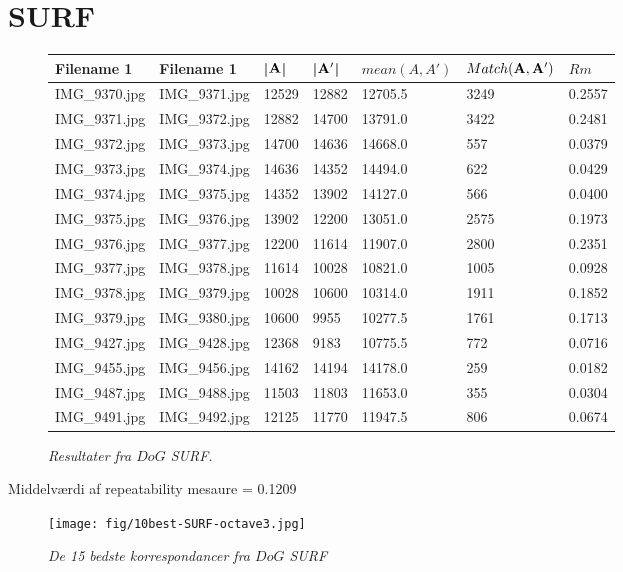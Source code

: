\section{SURF}
\begin{figure}[H]
    \centering
    \begin{center}    
    \begin{tabular}{ | l | l | l | l | l | l | l |}
    \hline
    Filename 1 & Filename 1 & |$\bold{A}$| & |$\bold{A'}$| & $mean(A,A')$ & $Match(\bold{A}, \bold{A}')$ & $Rm$ \\ \hline
IMG\_9370.jpg &	IMG\_9371.jpg &	12529 &	12882 &	12705.5 &	3249 &	0.2557\\ \hline
IMG\_9371.jpg &	IMG\_9372.jpg &	12882 &	14700 &	13791.0 &	3422 &	0.2481\\ \hline
IMG\_9372.jpg &	IMG\_9373.jpg &	14700 &	14636 &	14668.0 &	557 &	0.0379\\ \hline
IMG\_9373.jpg &	IMG\_9374.jpg &	14636 &	14352 &	14494.0 &	622 &	0.0429\\ \hline
IMG\_9374.jpg &	IMG\_9375.jpg &	14352 &	13902 &	14127.0 &	566 &	0.0400\\ \hline
IMG\_9375.jpg &	IMG\_9376.jpg &	13902 &	12200 &	13051.0 &	2575 &	0.1973\\ \hline
IMG\_9376.jpg &	IMG\_9377.jpg &	12200 &	11614 &	11907.0 &	2800 &	0.2351\\ \hline
IMG\_9377.jpg &	IMG\_9378.jpg &	11614 &	10028 &	10821.0 &	1005 &	0.0928\\ \hline
IMG\_9378.jpg &	IMG\_9379.jpg &	10028 &	10600 &	10314.0 &	1911 &	0.1852\\ \hline
IMG\_9379.jpg &	IMG\_9380.jpg &	10600 &	9955 &	10277.5 &	1761 &	0.1713\\ \hline
IMG\_9427.jpg &	IMG\_9428.jpg &	12368 &	9183 &	10775.5 &	772 &	0.0716\\ \hline
IMG\_9455.jpg &	IMG\_9456.jpg &	14162 &	14194 &	14178.0 &	259 &	0.0182\\ \hline
IMG\_9487.jpg &	IMG\_9488.jpg &	11503 &	11803 &	11653.0 &	355 &	0.0304\\ \hline
IMG\_9491.jpg &	IMG\_9492.jpg &	12125 &	11770 &	11947.5 &	806 &	0.0674\\ \hline
    \end{tabular}       
    \caption{{\footnotesize \textit{Resultater fra $DoG$ SURF.}}}
    \label{tab:SURFOCTAVE3}
     \end{center}
     \vspace{-2.5em}
\end{figure} \noindent
Middelværdi af repeatability mesaure = 0.1209
\begin{figure}[H]
    \centering
    \texttt{[image: fig/10best-SURF-octave3.jpg]}
    \vspace{-0.5em}   
    \begin{center}
    \caption{{\footnotesize \textit{
    De 15 bedste korrespondancer fra $DoG$ SURF}}}
    \label{fig:lindblob}
     \end{center}
  \end{figure}
       \vspace{-2.7em}
\noindent
